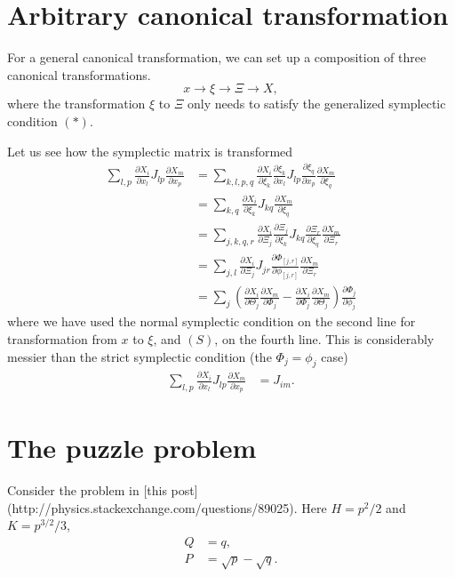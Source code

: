 \documentclass{article}
\begin{document}
\section{Arbitrary canonical transformation}


For a general canonical transformation,
we can set up a composition of three canonical transformations.
$$
x \rightarrow \xi \rightarrow \Xi \rightarrow X,
$$
where the transformation $\xi$ to $\Xi$
only needs to satisfy the generalized symplectic condition $(*)$.

Let us see how the symplectic matrix is transformed
\begin{align}
\sum_{l,p}
\frac{\partial X_i }{\partial x_l }
J_{lp}
\frac{\partial X_m }{\partial x_p }
&=
\sum_{k,l,p,q}
\frac{\partial X_i }{\partial \xi_k }
\frac{\partial \xi_k }{\partial x_l }
J_{lp}
\frac{\partial \xi_q }{\partial x_p }
\frac{\partial X_m }{\partial \xi_q }
\\
&=
\sum_{k,q}
\frac{\partial X_i }{\partial \xi_k }
J_{kq}
\frac{\partial X_m }{\partial \xi_q }
\\
&=
\sum_{j,k,q,r}
\frac{\partial X_i }{\partial \Xi_j }
\frac{\partial \Xi_j }{\partial \xi_k }
J_{kq}
\frac{\partial \Xi_r }{\partial \xi_q }
\frac{\partial X_m }{\partial \Xi_r }
\\
&=
\sum_{j,l}
\frac{\partial X_i }{\partial \Xi_j }
J_{jr}
\frac{\partial \Phi_{[j,r]} }{\partial \phi_{[j,r]} }
\frac{\partial X_m }{\partial \Xi_r }
\\
&=
\sum_{j}
\left(
\frac{\partial X_i }{\partial \Theta_j }
\frac{\partial X_m }{\partial \Phi_j }
-
\frac{\partial X_i }{\partial \Phi_j }
\frac{\partial X_m }{\partial \Theta_j }
\right)
\frac{\partial \Phi_j }{\partial \phi_j }
\end{align}
where we have used the normal symplectic condition on the second line for transformation from $x$ to $\xi$,
and $(S)$, on the fourth line.
This is considerably messier than
the strict symplectic condition (the $\Phi_j = \phi_j$ case)
\begin{align}
\sum_{l,p}
\frac{\partial X_i }{\partial x_l}
J_{lp}
\frac{\partial X_m}{\partial x_p}
&=
J_{im}.
\end{align}

\section{The puzzle problem}

Consider the problem in [this post](http://physics.stackexchange.com/questions/89025).
Here $H = p^2/2$ and $K = p^{3/2}/3$,
\begin{align}
Q &= q, \\
P &= \sqrt{p} - \sqrt{q}.
\end{align}
\end{document}
